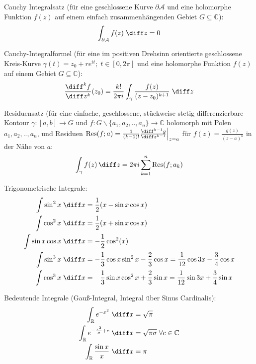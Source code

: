 \documentclass[11pt]{article}
\numberwithin{equation}{section}
\begin{document}
        Cauchy Integralsatz (für eine geschlossene Kurve $\partial \mathcal{A}$ und eine holomorphe Funktion $f(z)$ auf einem einfach zusammenhängenden Gebiet $G \subseteq \mathbb{C}$):
        \begin{equation}
          \int_{\partial \mathcal{A}} f(z)\;\diff z = 0
        \end{equation}

        Cauchy-Integralformel (für eine im positiven Drehsinn orientierte geschlossene Kreis-Kurve $\gamma(t)=z_0+re^{it};\;t\in[0,2\pi]$ und eine holomorphe Funktion $f(z)$ auf einem Gebiet $G \subseteq \mathbb{C}$):
        \begin{equation}
          \frac{\diff^k f}{\diff z^k}(z_0) = \frac{k!}{2\pi i} \int_\gamma \frac{f(z)}{(z-z_0)^{k+1}}\;\diff z
        \end{equation}

        Residuensatz (für eine einfache, geschlossene, stückweise stetig differenzierbare Kontour $\gamma:\left[a,b\right]\rightarrow G$ und $f:G\backslash\lbrace a_1, a_2, .., a_n\rbrace \rightarrow \mathbb{C}$ holomorph mit Polen $a_1, a_2, .., a_n$, und Residuen $\mathrm{Res}(f; a) = \frac{1}{(k-1)!}\frac{\diff^{k-1} g}{\diff z^{k-1}}\Big|_{z=a}$ für $f(z)=\frac{g(z)}{(z-a)^k}$ in der Nähe von $a$:
        \begin{equation}
          \int_\gamma f(z)\,\diff z = 2\pi i \sum_{k=1}^{n} \mathrm{Res}(f; a_k)
        \end{equation}

  			Trigonometrische Integrale:
  			\begin{equation}
  				\begin{split}
  					\int \sin^2 x\;\diff x &= \frac{1}{2}( x-\sin  x\cos  x) \\
  					\int \cos^2 x\;\diff x &= \frac{1}{2}( x+\sin  x\cos  x) \\
  					\int{\sin x\cos x\;\diff x} &= -\frac{1}{2}\cos^2( x) \\
  					\int \sin^3 x\;\diff x &= -\frac{1}{3}\cos{ x}\sin^2{ x}-\frac{2}{3}\cos{ x}
            = \frac{1}{12}\cos{3 x}-\frac{3}{4}\cos{ x} \\
  					\int \cos^3 x\;\diff x &= \phantom{-}\frac{1}{3}\sin x \cos^2 x+\frac{2}{3}\sin  x
            = \frac{1}{12}\sin{3 x}+\frac{3}{4}\sin{ x} \\
  				\end{split}
  			\end{equation}

        Bedeutende Integrale (Gauß-Integral, Integral über Sinus Cardinalis):
        \begin{equation}
          \begin{aligned}
            \int_\mathbb{R} e^{-x^2}\;\diff x &= \sqrt{\pi} \\
            \int_\mathbb{R} e^{-\frac{x^2}{\sigma}+c}\;\diff x &= \sqrt{\pi\sigma} \;\forall c\in\mathbb{C} \\
            \int_\mathbb{R} \frac{\sin x}{x}\;\diff x &= \pi \\
          \end{aligned}
        \end{equation}
\end{document}
